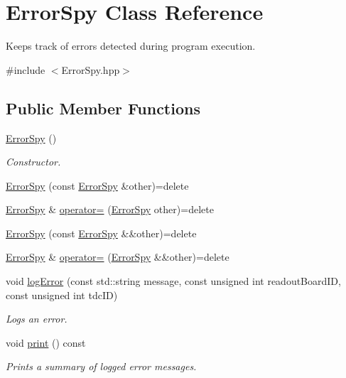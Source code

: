 \hypertarget{class_error_spy}{}\section{Error\+Spy Class Reference}
\label{class_error_spy}


Keeps track of errors detected during program execution.  




{\ttfamily \#include $<$Error\+Spy.\+hpp$>$}

\subsection*{Public Member Functions}
\begin{DoxyCompactItemize}
\item 
\hyperlink{class_error_spy_a8d07ccabb00ac3925d94d77e7092bc99}{Error\+Spy} ()
\begin{DoxyCompactList}\small\item\em Constructor. \end{DoxyCompactList}\item 
\hyperlink{class_error_spy_aa10c8604df16528fa51fc00e9b84e184}{Error\+Spy} (const \hyperlink{class_error_spy}{Error\+Spy} \&other)=delete
\item 
\hyperlink{class_error_spy}{Error\+Spy} \& \hyperlink{class_error_spy_a1ee5e050efa950d40f48245550cb5aad}{operator=} (\hyperlink{class_error_spy}{Error\+Spy} other)=delete
\item 
\hyperlink{class_error_spy_a07d843cb06eb0a6bfd47734b6c31e289}{Error\+Spy} (const \hyperlink{class_error_spy}{Error\+Spy} \&\&other)=delete
\item 
\hyperlink{class_error_spy}{Error\+Spy} \& \hyperlink{class_error_spy_a1a48d70388ccb40d03357ce9f93158c9}{operator=} (\hyperlink{class_error_spy}{Error\+Spy} \&\&other)=delete
\item 
void \hyperlink{class_error_spy_a5177c4dac196484a1a0ccaa231c033d8}{log\+Error} (const std\+::string message, const unsigned int readout\+Board\+ID, const unsigned int tdc\+ID)
\begin{DoxyCompactList}\small\item\em Logs an error. \end{DoxyCompactList}\item 
void \hyperlink{class_error_spy_a85e971684266e774c896ee681850614a}{print} () const
\begin{DoxyCompactList}\small\item\em Prints a summary of logged error messages. \end{DoxyCompactList}\end{DoxyCompactItemize}
